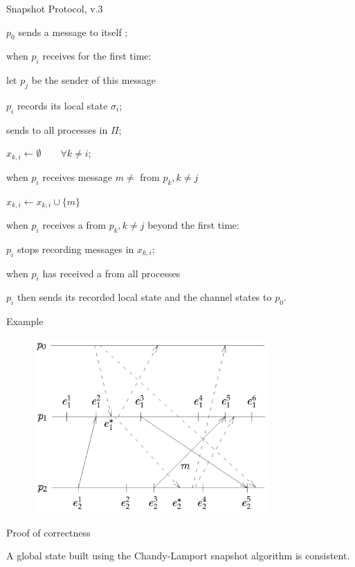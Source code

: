 \begin{frame}{Snapshot Protocol, v.3}
	
\BEL
\item $p_0$ sends a message \SNAPSHOT to itself ;
\item when $p_i$ receives \SNAPSHOT for the \alert{first time}:
  \BI 
  \item let $p_j$ be the sender of this message
  \item $p_i$ records its local state $\sigma_i$;
  \item sends \SNAPSHOT to all processes in $\Pi$;
  \item $x_{k,i} \gets \emptyset \qquad \forall k \neq i$;
  \EI
\item when $p_i$ receives message $m \neq$ \SNAPSHOT from $p_k, k \neq j$
  \BI
  \item $x_{k,i} \gets x_{k,i} \cup \{ m \}$
  \EI
\item when $p_i$ receives a \SNAPSHOT from
  $p_k, k \neq j$ beyond the \alert{first time}:
  \BI
  \item $p_i$ stops recording messages in $x_{k,i}$;
  \EI
\item when $p_i$ has received a \SNAPSHOT
  from all processes
  \BI
  \item $p_i$ then sends its recorded local state and the channel states to $p_0$.
  \EI
\EEL

\end{frame}

\begin{frame}{Example}
\begin{figure} 
\includegraphics[width=9cm]{figs/03/figure-10}
\end{figure}
\end{frame}

\begin{frame}{Proof of correctness}
	
\begin{theorem}
A global state built using the Chandy-Lamport snapshot algorithm is consistent.
\end{theorem}
\end{frame}


